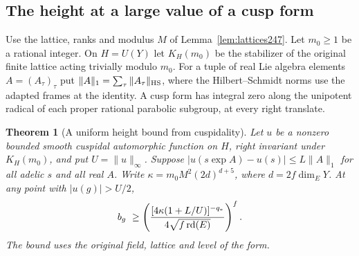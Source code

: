 \documentclass[a4paper,11pt]{article}
\newtheorem{theorem}[proposition]{Theorem}
\theoremstyle{definition}
\theoremstyle{remark}
\numberwithin{equation}{section}
\begin{document}
\subsection{The height at a large value of a cusp form}\label{nav:VI-35}
Use the lattice, ranks and modulus \(M\) of Lemma~\ref{lem:lattices247}.
Let \(m_0\ge1\) be a rational integer. On \(H=U(Y)\) let
\(K_H(m_0)\) be the stabilizer of the original finite lattice acting
trivially modulo \(m_0\). For a tuple of real Lie algebra elements
\(A=(A_\tau)_\tau\) put \(\|A\|_1=\sum_\tau\|A_\tau\|_{\rm HS}\),
where the Hilbert--Schmidt norms use the adapted frames at the identity.
A cusp form has integral zero along the unipotent radical of each proper
rational parabolic subgroup, at every right translate.

\begin{theorem}[A uniform height bound from cuspidality]
\label{thm:cusp247}
Let \(u\) be a nonzero bounded smooth cuspidal automorphic function on
\(H\), right invariant under \(K_H(m_0)\), and put \(U=\|u\|_\infty\).
Suppose \(|u(s\exp A)-u(s)|\le L\|A\|_1\) for all adelic \(s\) and
all real \(A\). Write \(\kappa=m_0M^2(2d)^{d+5}\), where
\(d=2f\dim_EY\). At any point with \(|u(g)|>U/2\),
\[
  b_g\ \ge
   \left(\frac{[4\kappa(1+L/U)]^{-q_*}}
                     {4\sqrt{f\,{\rm rd}(E)}}\right)^f .
\]
The bound uses the original field, lattice and level of the form.
\end{theorem}
\end{document}
